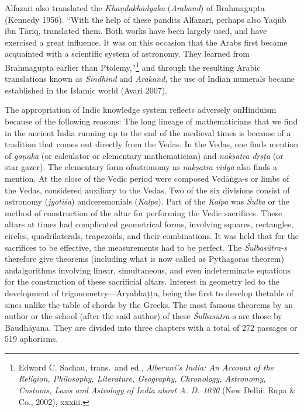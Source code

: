 Alfazari also translated the \textit{Khaṇḍakhādyaka} (\textit{Arakand}) of Brahmagupta (Kennedy 1956). “With the help of these pandits Alfazari, perhaps also Yaqūb ibn Tāriq, translated them. Both works have been largely used, and have exercised a great influence. It was on this occasion that the Arabs first became acquainted with a scientific system of astronomy. They learned from Brahmagupta earlier than Ptolemy,”\footnote{Edward C. Sachau, trans.\ and ed., \textit{Alberuni's 	India: An Account of the Religion, Philosophy, Literature, 	Geography, Chronology, Astronomy, Customs, Laws and Astrology of India about A. D. 1030}  (New Delhi: Rupa \& Co., 2002), xxxiii.} and through the resulting Arabic translations known as \textit{Sindhind} and \textit{Arakand}, the use of Indian numerals became established in the Islamic world (Avari 2007).

The appropriation of Indic knowledge system reflects adversely on\break Hinduism because of the following reasons: The long lineage of mathematicians that we find in the ancient India running up to the end of the medieval times is because of a tradition that comes out directly from the Vedas. In the Vedas, one finds mention of \textit{gaṇaka} (or calculator or elementary mathematician) and \textit{nakṣatra dṛṣṭa} (or star gazer). The elementary form of\break astronomy as \textit{nakṣatra vidyā} also finds a mention. At the close of the Vedic period were composed Vedāṅga-s or limbs of the Vedas, considered auxiliary to the Vedas. Two of the six divisions consist of astronomy (\textit{jyotiśa}) and\break ceremonials (\textit{Kalpa}). Part of the \textit{Kalpa} was \textit{Śulba} or the method of construction of the altar for performing the Vedic sacrifices. These altars at times had complicated geometrical forms, involving squares, rectangles, circles, quadrilaterals, trapezoids, and their combinations. It was held that for the sacrifices to be effective, the measurements had to be perfect. The \textit{Śulbasūtra-s} therefore give theorems (including what is now called as Pythagoras theorem) and\break algorithms involving linear, simultaneous, and even indeterminate equations for the construction of these sacrificial altars. Interest in geometry led to the development of trigonometry—Āryabhaṭṭa, being the first to develop the\break table of sines unlike the table of chords by the Greeks. The most famous theorems by an author or the school (after the said author) of these \textit{Śulbasūtra-s} are those by Baudhāyana. They are divided into three chapters with a total of 272 passages or 519 aphorisms.
\eject

